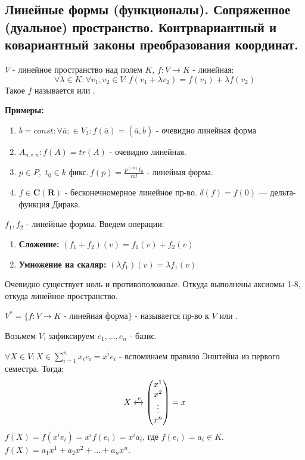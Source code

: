 \subsection{Линейные формы (функционалы). Сопряженное (дуальное) пространство. Контрвариантный и ковариантный законы преобразования координат.}

 $V$ - линейное пространство над полем $K$, $f:V \rightarrow  K$ - линейная:
$$\forall \lambda \in K: \forall  v_1,v_2 \in V: f(v_1+ \lambda v_2) = f(v_1)+ \lambda f(v_2)$$
Такое $f$ называется  или .

\textbf{Примеры:}

\begin{enumerate}
    \item $\overline{b} = const: \forall \overline{a}: \in V_3: f(\overline{a}) = (\overline{a},\overline{b})$ - очевидно линейная форма
    \item $A_{n\times n}: f(A) = tr (A)$ - очевидно линейная.
    \item $p \in P$, $\, t_0 \in k \text{ фикс.} \, f(p)= \frac{p^{(m)}t_0}{m!}$ - линейная форма.
    \item $f\in \mathbf{C}(\mathbf{R})$ - бесконечномерное линейное пр-во. $\delta(f)=f(0)$ --- дельта-функция Дирака.
\end{enumerate}

$f_1, f_2$ - линейные формы. Введем операции:
\begin{enumerate}
    \item \textbf{Сложение:} $(f_1+f_2)(v) = f_1(v) + f_2(v)$
    \item \textbf{Умножение на скаляр:}  $(\lambda f_1) (v) = \lambda f_1(v)$
\end{enumerate}
Очевидно существует ноль и противоположные. Откуда выполнены аксиомы 1-8, откуда линейное пространство. 

$V^* = \{f: V \rightarrow K \text{ - линейная форма}\}$ - называется  пр-во к $V$ или .

Возьмем $V$, зафиксируем  $e_1,\ldots,e_n$ - базис.

$\forall X \in V: X\in \sum\limits_{i=1}^nx_i e_i = x^ie_i$ - вспоминаем правило Энштейна из первого семестра. Тогда:
$$X \xleftrightarrow{e}\begin{pmatrix}
    x^1 \\
    x^2 \\
    \vdots \\
    x^n
\end{pmatrix} =x$$ 
$f(X) = f(x^ie_i) = x^if(e_i) = x^ia_i$, где $f(e_i) = a_i \in K$. $f(X) = a_1x^1+a_2x^2 + \ldots + a_n x^n$.

